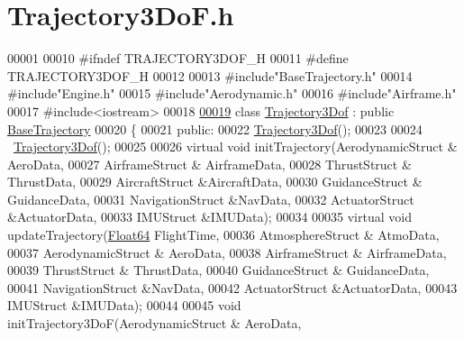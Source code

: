 \hypertarget{_trajectory3_do_f_8h_source}{}\section{Trajectory3\+Do\+F.\+h}
\label{_trajectory3_do_f_8h_source}

\begin{DoxyCode}
00001 
00010 \textcolor{preprocessor}{#ifndef TRAJECTORY3DOF\_H}
00011 \textcolor{preprocessor}{#define TRAJECTORY3DOF\_H}
00012 
00013 \textcolor{preprocessor}{#include"BaseTrajectory.h"}
00014 \textcolor{preprocessor}{#include"Engine.h"}
00015 \textcolor{preprocessor}{#include"Aerodynamic.h"}
00016 \textcolor{preprocessor}{#include"Airframe.h"}
00017 \textcolor{preprocessor}{#include<iostream>}
00018 
\hyperlink{group___trajectory}{00019} \textcolor{keyword}{class }\hyperlink{group___trajectory_class_trajectory3_dof}{Trajectory3Dof} : \textcolor{keyword}{public} \hyperlink{group___trajectory_class_base_trajectory}{BaseTrajectory}
00020 \{
00021 \textcolor{keyword}{public}:
00022     \hyperlink{group___trajectory_class_trajectory3_dof}{Trajectory3Dof}();
00023 
00024     ~\hyperlink{group___trajectory_class_trajectory3_dof}{Trajectory3Dof}();
00025 
00026     \textcolor{keyword}{virtual} \textcolor{keywordtype}{void} initTrajectory(AerodynamicStruct & AeroData,
00027                                 AirframeStruct & AirframeData,
00028                                 ThrustStruct & ThrustData,
00029                                 AircraftStruct &AircraftData,
00030                                 GuidanceStruct & GuidanceData,
00031                                 NavigationStruct &NavData,
00032                                 ActuatorStruct &ActuatorData,
00033                                 IMUStruct &IMUData);
00034 
00035     \textcolor{keyword}{virtual} \textcolor{keywordtype}{void} updateTrajectory(\hyperlink{group___tools_ga3f1431cb9f76da10f59246d1d743dc2c}{Float64} FlightTime,
00036                             AtmosphereStruct & AtmoData,
00037                             AerodynamicStruct & AeroData,
00038                             AirframeStruct & AirframeData,
00039                             ThrustStruct & ThrustData,
00040                             GuidanceStruct & GuidanceData,
00041                             NavigationStruct &NavData,
00042                             ActuatorStruct &ActuatorData,
00043                             IMUStruct &IMUData);
00044 
00045     \textcolor{keywordtype}{void} initTrajectory3DoF(AerodynamicStruct & AeroData,

\end{DoxyCode}
